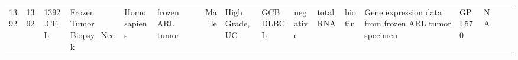 \documentclass[]{article}
\begin{document}
\begin{longtable}[]{@{}lllllllrllllllllll@{}}
\begin{minipage}[t]{0.02\columnwidth}
1392\strut
\end{minipage} & \begin{minipage}[t]{0.01\columnwidth}\raggedright
1392\strut
\end{minipage} & \begin{minipage}[t]{0.02\columnwidth}\raggedright
1392.CEL\strut
\end{minipage} & \begin{minipage}[t]{0.06\columnwidth}\raggedright
Frozen Tumor Biopsy\_Neck\strut
\end{minipage} & \begin{minipage}[t]{0.02\columnwidth}\raggedright
Homo sapiens\strut
\end{minipage} & \begin{minipage}[t]{0.04\columnwidth}\raggedright
frozen ARL tumor\strut
\end{minipage} & \begin{minipage}[t]{0.05\columnwidth}\raggedleft
34\strut
\end{minipage} & \begin{minipage}[t]{0.04\columnwidth}\raggedright
Male\strut
\end{minipage} & \begin{minipage}[t]{0.06\columnwidth}\raggedright
High Grade, UC\strut
\end{minipage} & \begin{minipage}[t]{0.06\columnwidth}\raggedright
GCB DLBCL\strut
\end{minipage} & \begin{minipage}[t]{0.04\columnwidth}\raggedright
negative\strut
\end{minipage} & \begin{minipage}[t]{0.02\columnwidth}\raggedright
total RNA\strut
\end{minipage} & \begin{minipage}[t]{0.01\columnwidth}\raggedright
biotin\strut
\end{minipage} & \begin{minipage}[t]{0.08\columnwidth}\raggedright
Gene expression data from frozen ARL tumor specimen\strut
\end{minipage} & \begin{minipage}[t]{0.01\columnwidth}\raggedright
GPL570\strut
\end{minipage} & \begin{minipage}[t]{0.00\columnwidth}\raggedright
NA\strut
\end{minipage} & \begin{minipage}[t]{0.01\columnwidth}\raggedright

\end{minipage}
\end{longtable}
\end{document}

